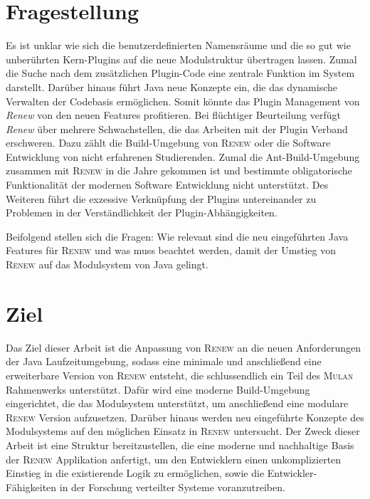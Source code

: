 \section{Fragestellung} \label{sec:KdS}
	Es ist unklar wie sich die benutzerdefinierten Namensräume und die so gut wie unberührten Kern-Plugins auf die neue Modulstruktur übertragen lassen. Zumal die Suche nach dem zusätzlichen Plugin-Code eine zentrale Funktion im System darstellt.\newline
	Darüber hinaus führt Java neue Konzepte ein, die das dynamische Verwalten der Codebasis ermöglichen. Somit könnte das Plugin Management von \textit{Renew} von den neuen Features profitieren. \bigbreak
	Bei flüchtiger Beurteilung verfügt \textit{Renew} über mehrere Schwachstellen, die das Arbeiten mit der Plugin Verband erschweren. Dazu zählt die Build-Umgebung von \textsc{Renew} oder die Software Entwicklung von nicht erfahrenen Studierenden. Zumal die Ant-Build-Umgebung zusammen mit \textsc{Renew} in die Jahre gekommen ist und bestimmte obligatorische Funktionalität der modernen Software Entwicklung nicht unterstützt. Des Weiteren führt die exzessive Verknüpfung der Plugins untereinander zu Problemen in der Verständlichkeit der Plugin-Abhängigkeiten.\bigbreak

	Beifolgend stellen sich die Fragen: Wie relevant sind die neu eingeführten Java Features für \textsc{Renew} und was muss beachtet werden, damit der Umstieg von \textsc{Renew} auf das Modulsystem von Java gelingt.

\section{Ziel} \label{sec:Z}
	Das Ziel dieser Arbeit ist die Anpassung von \textsc{Renew} an die neuen Anforderungen der Java Laufzeitumgebung, sodass eine minimale und anschließend eine erweiterbare Version von \textsc{Renew} entsteht, die schlussendlich ein Teil des \textsc{Mulan} Rahmenwerks unterstützt. Dafür wird eine moderne Build-Umgebung eingerichtet, die das Modulsystem unterstützt, um anschließend eine modulare \textsc{Renew} Version aufzusetzen. Darüber hinaus werden neu eingeführte Konzepte des Modulsystems auf den möglichen Einsatz in \textsc{Renew} untersucht. \newline
	Der Zweck dieser Arbeit ist eine Struktur bereitzustellen, die eine moderne und nachhaltige Basis der \textsc{Renew} Applikation anfertigt, um den Entwicklern einen unkomplizierten Einstieg in die existierende Logik zu ermöglichen, sowie die Entwickler-Fähigkeiten in der Forschung verteilter Systeme voranzutreiben.\bigbreak


